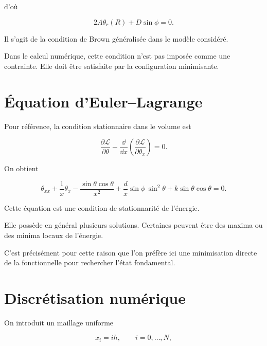 \documentclass[a4paper,11pt]{article}
\begin{document}
d'où

\begin{equation}
\boxed{
2A\theta_r(R)
+
D\sin\phi
=
0.
}
\end{equation}

Il s'agit de la condition de Brown généralisée dans le modèle considéré.

Dans le calcul numérique, cette condition n'est pas imposée comme une
contrainte. Elle doit être satisfaite par la configuration minimisante.

\section{Équation d'Euler--Lagrange}

Pour référence, la condition stationnaire dans le volume est

\begin{equation}
\frac{\partial\mathcal L}{\partial\theta}
-
\frac{\dd}{\dd x}
\left(
\frac{\partial\mathcal L}{\partial\theta_x}
\right)
=0.
\end{equation}

On obtient

\begin{equation}
\boxed{
\theta_{xx}
+
\frac{1}{x}\theta_x
-
\frac{\sin\theta\cos\theta}{x^2}
+
\frac{d}{x}\sin\phi\,\sin^2\theta
+
k\sin\theta\cos\theta
=
0.
}
\end{equation}

Cette équation est une condition de stationnarité de l'énergie.

Elle possède en général plusieurs solutions. Certaines peuvent être des
maxima ou des minima locaux de l'énergie.

C'est précisément pour cette raison que l'on préfère ici une minimisation
directe de la fonctionnelle pour rechercher l'état fondamental.

\section{Discrétisation numérique}

On introduit un maillage uniforme

\begin{equation}
x_i=ih,
\qquad
i=0,\ldots,N,
\end{equation}
\end{document}
